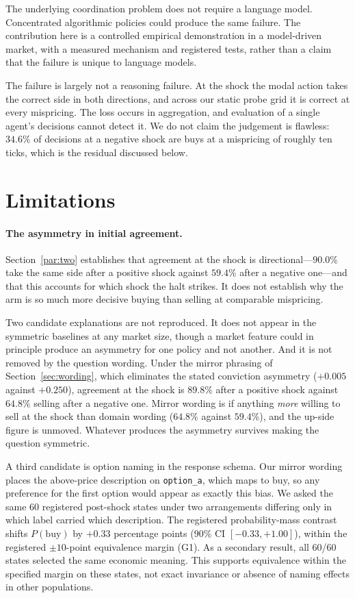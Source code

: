 \documentclass[11pt]{article}
\begin{document}
The underlying coordination problem does not require a language model.
Concentrated algorithmic policies could produce the same failure. The
contribution here is a controlled empirical demonstration in a model-driven
market, with a measured mechanism and registered tests, rather than a claim
that the failure is unique to language models.

The failure is largely not a reasoning failure. At the shock the modal action
takes the correct side in both directions, and across our static probe grid it
is correct at every mispricing. The loss occurs in aggregation, and evaluation
of a single agent's decisions cannot detect it. We do not claim the judgement
is flawless: $34.6\%$ of decisions at a negative shock are buys at a mispricing
of roughly ten ticks, which is the residual discussed below.

\section{Limitations}

\paragraph{The asymmetry in initial agreement.} Section~\ref{par:two}
establishes that agreement at the shock is directional---$90.0\%$ take the same
side after a positive shock against $59.4\%$ after a negative one---and that
this accounts for which shock the halt strikes. It does not establish why the
arm is so much more decisive buying than selling at comparable mispricing.

Two candidate explanations are not reproduced. It does not appear in the
symmetric baselines at any market size, though a market feature could in
principle produce an asymmetry for one policy and not another. And it is not
removed by the question wording. Under the mirror phrasing of
Section~\ref{sec:wording}, which eliminates the stated conviction asymmetry
($+0.005$ against $+0.250$), agreement at the shock is
$89.8\%$ after a positive shock against $64.8\%$ selling after a negative one.
Mirror wording is if anything \emph{more} willing to sell at the shock than
domain wording ($64.8\%$ against $59.4\%$), and the up-side figure is unmoved.
Whatever produces the asymmetry survives making the question symmetric.

A third candidate is option naming in the response schema. Our mirror wording
places the above-price description on
\texttt{option\_a}, which maps to buy, so any preference for the first option
would appear as exactly this bias. We asked the same 60 registered post-shock
states under two arrangements differing only in which label carried which
description. The registered probability-mass contrast shifts $P(\text{buy})$
by $+0.33$ percentage points (90\% CI $[-0.33,+1.00]$), within the registered
$\pm10$-point equivalence margin (G1). As a secondary result, all 60/60 states
selected the same economic meaning. This supports equivalence within the
specified margin on these states, not exact invariance or absence of naming
effects in other populations.
\end{document}
